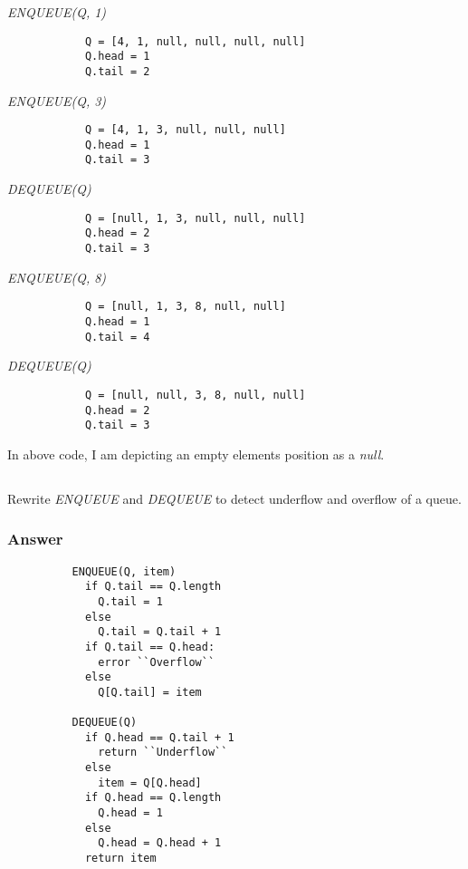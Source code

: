           \textit{ENQUEUE(Q, 1)}
          \begin{verbatim}
            Q = [4, 1, null, null, null, null]
            Q.head = 1
            Q.tail = 2
          \end{verbatim}

          \textit{ENQUEUE(Q, 3)}
          \begin{verbatim}
            Q = [4, 1, 3, null, null, null]
            Q.head = 1
            Q.tail = 3
          \end{verbatim}

          \textit{DEQUEUE(Q)}
          \begin{verbatim}
            Q = [null, 1, 3, null, null, null]
            Q.head = 2
            Q.tail = 3
          \end{verbatim}

          \textit{ENQUEUE(Q, 8)}
          \begin{verbatim}
            Q = [null, 1, 3, 8, null, null]
            Q.head = 1
            Q.tail = 4
          \end{verbatim}

          \textit{DEQUEUE(Q)}
          \begin{verbatim}
            Q = [null, null, 3, 8, null, null]
            Q.head = 2
            Q.tail = 3
          \end{verbatim}

          In above code, I am depicting an empty elements position as a
          \textit{null}.

      \subsection{}

      Rewrite \textit{ENQUEUE} and \textit{DEQUEUE} to detect underflow and
      overflow of a queue.

        \subsubsection {Answer}

        \begin{verbatim}
          ENQUEUE(Q, item)
            if Q.tail == Q.length
              Q.tail = 1
            else
              Q.tail = Q.tail + 1
            if Q.tail == Q.head:
              error ``Overflow``
            else
              Q[Q.tail] = item

          DEQUEUE(Q)
            if Q.head == Q.tail + 1
              return ``Underflow``
            else
              item = Q[Q.head]
            if Q.head == Q.length
              Q.head = 1
            else
              Q.head = Q.head + 1
            return item
        \end{verbatim}

